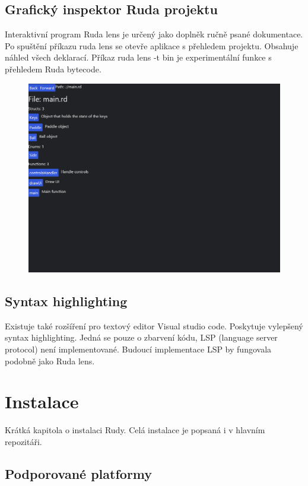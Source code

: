 \documentclass[12pt, a4paper,
twoside,        %
openright
]{report}
\let\oldchapter\chapter
\renewcommand{\chapter}{
	\clearpage
	\pagestyle{fancy}
	\oldchapter
}
\begin{document}
\section{Grafický inspektor Ruda projektu}

Interaktivní program Ruda lens je určený jako doplněk ručně psané dokumentace. Po spuštění příkazu ruda lens se otevře aplikace s přehledem projektu. Obsahuje náhled všech deklarací. Příkaz ruda lens -t bin je experimentální funkce s přehledem Ruda bytecode.

\begin{figure}[h]
	\centering
	\includegraphics[width=0.8\linewidth]{image/lens.png}
\end{figure}

\section{Syntax highlighting}

Existuje také rozšíření pro textový editor Visual studio code. Poskytuje vylepšený syntax highlighting. Jedná se pouze o zbarvení kódu, LSP (language server protocol) není implementované. Budoucí implementace LSP by fungovala podobně jako Ruda lens.

\chapter{Instalace}

Krátká kapitola o instalaci Rudy. Celá instalace je popsaná i v hlavním repozitáři.

\section{Podporované platformy}
\end{document}
